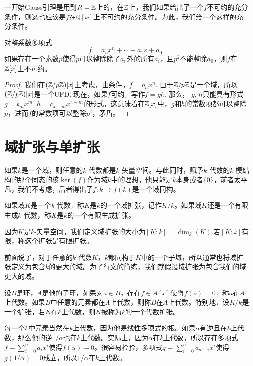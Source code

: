 一开始Gauss引理是用到$R=\mathbb{Z}$上的，在$\mathbb{Z}$上，我们如果给出了一个$f$不可约的充分条件，则这也应该是$f$在$\mathbb{Q}[x]$上不可约的充分条件。为此，我们给一个这样的充分条件。

\begin{pro}[Eisenstein判别法]
	对整系数多项式
	\[
		f=a_nx^n+\cdots+a_1x+a_0,
	\]
	如果存在一个素数$p$使得$p$可以整除除了$a_n$外的所有$a_i$，且$p^2$不能整除$a_0$，则$f$在$\mathbb{Z}[x]$上不可约。
\end{pro}

\begin{proof}
	我们在$(\mathbb{Z}/p\mathbb{Z})[x]$上考虑，由条件，$f=a_nx^n$. 由于$\mathbb{Z}/p\mathbb{Z}$是一个域，所以$(\mathbb{Z}/p\mathbb{Z})[x]$是一个UFD. 现在，如果$f$可约，写作$f=gh$. 那么，
	$g$, $h$只能具有形式$g=b_m x^m$, $h=c_{n-m}x^{n-m}$的形式，这意味着在$\mathbb{Z}[x]$中，$g$和$h$的常数项都可以整除$p$，进而$f$的常数项可以整除$p^2$，矛盾。
\end{proof}

\section{域扩张与单扩张}

如果$k$是一个域，则任意的$k$-代数都是$k$-矢量空间。与此同时，赋予$k$-代数的$k$-模结构的那个同态的核$\ker(f)$作为域$k$中的理想，他只能是$k$本身或者$\{0\}$，前者太平凡，我们不考虑，后者得出了$f:k\to f(k)$是一个域同构。

\para 如果域$K$是一个$k$-代数，称$K$是$k$的一个域扩张，记作$K/k$。如果域$K$还是一个有限生成$k$-代数，称$K$是$k$的一个有限生成扩张。

因为$K$是$k$-矢量空间，我们定义域扩张的大小为$[K:k]=\dim_k(K)$.若$[K:k]$有限，称这个扩张是有限扩张。
\endpara

前面说了，对于任意的$k$-代数$K$，$k$都同构于$K$中的一个子域，所以通常也将域扩张定义为包含$k$的更大的域。为了行文的简练，我们就假设域扩张为包含我们的域更大的域。

\para 设$B$是环，$A$是他的子环，如果对$a\in B$，存在$f\in A[x]$使得$f(a)=0$，称$a$在$A$上代数。如果$B$中任意的元素都在$A$上代数，则称$B$在$A$上代数。特别地，设$K/k$是一个扩张，若$K$在$k$上代数，则$K$被称为$k$的一个代数扩张。\endpara

每一个$k$中元素当然在$k$上代数，因为他是线性多项式的根。如果$\alpha$有逆且在$k$上代数，那么他的逆$1/\alpha$也在$k$上代数。实际上，因为$\alpha$在$k$上代数，所以存在多项式$f=\sum_{i=0}^na_ix^i$使得$f(\alpha)=0$。很容易检验，多项式$g=\sum_{i=0}^na_{n-i}x^i$使得$g(1/\alpha)=0$成立，所以$1/\alpha$在$k$上代数。

